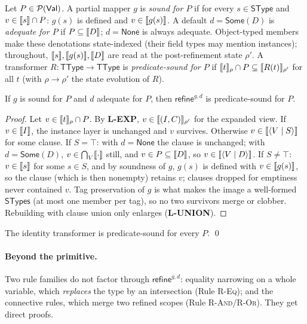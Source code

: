 \documentclass[11pt]{article}
\newcommand{\Pred}{\mathcal{P}(\Val)}
\newcommand{\refineop}{\mathsf{refine}}
\newcommand{\SType}{\mathsf{SType}}
\newcommand{\TType}{\mathsf{TType}}
\newcommand{\STypes}{\mathsf{STypes}}
\newcommand{\clause}[2]{\langle #1 \mid #2 \rangle}
\begin{document}
\begin{definition}
\label{def:pred-sound}
Let $P \in \Pred$. A partial mapper $g$ is \emph{sound for $P$} if for every
$s \in \SType$ and $v \in \llbracket s \rrbracket \cap P$: $g(s)$ is defined and
$v \in \llbracket g(s) \rrbracket$. A default $d = \mathsf{Some}(D)$ is \emph{adequate for
$P$} if $P \subseteq \llbracket D \rrbracket$; $d = \mathsf{None}$ is always adequate.
Object-typed members make these denotations state-indexed (their field types
may mention instances); throughout, $\llbracket s \rrbracket, \llbracket g(s) \rrbracket, \llbracket D \rrbracket$ are read
at the post-refinement state $\rho'$.
A transformer $R : \TType \to \TType$ is \emph{predicate-sound for $P$} if
$\llbracket t \rrbracket_\rho \cap P \subseteq \llbracket R(t) \rrbracket_{\rho'}$ for all $t$ (with
$\rho \to \rho'$ the state evolution of $R$).
\end{definition}

\begin{lemma}
\label{lem:branchwise-sound}
If $g$ is sound for $P$ and $d$ adequate for $P$, then $\refineop^{g,d}$ is
predicate-sound for $P$.
\end{lemma}
\begin{proof}
Let $v \in \llbracket t \rrbracket_\rho \cap P$. By \textbf{L-EXP},
$v \in \llbracket (I,C) \rrbracket_{\rho'}$ for the expanded view. If $v \in \llbracket I \rrbracket$, the
instance layer is unchanged and $v$ survives. Otherwise
$v \in \sem{\clause{V}{S}}$ for some clause. If $S = \top$: with
$d = \mathsf{None}$ the clause is unchanged; with $d = \mathsf{Some}(D)$,
$v \in \bigcap_{V}\llbracket \cdot \rrbracket$ still, and $v \in P \subseteq \llbracket D \rrbracket$, so
$v \in \sem{\clause{V}{D}}$. If $S \neq \top$: $v \in \llbracket s \rrbracket$ for some
$s \in S$, and by soundness of $g$, $g(s)$ is defined with
$v \in \llbracket g(s) \rrbracket$, so the clause (which is then nonempty) retains $v$;
clauses dropped for emptiness never contained $v$. Tag preservation of $g$
is what makes the image a well-formed $\STypes$ (at most one member per
tag), so no two survivors merge or clobber.
Rebuilding with clause union only enlarges (\textbf{L-UNION}).
\end{proof}

\begin{lemma}
\label{lem:identity-sound}
The identity transformer is predicate-sound for every $P$. \qed
\end{lemma}

\paragraph{Beyond the primitive.}
Two rule families do not factor through $\refineop^{g,d}$:
equality narrowing on a whole variable, which \emph{replaces} the type by an
intersection (Rule \textsc{R-Eq}); and the connective rules, which merge two
refined scopes (Rule \textsc{R-And}/\textsc{R-Or}). They get direct proofs.
\end{document}
